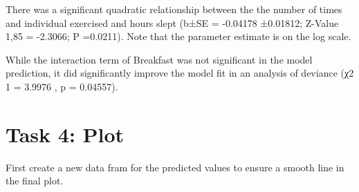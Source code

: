 \documentclass[
]{article}
\newenvironment{Shaded}{\begin{snugshade}}{\end{snugshade}}
\newcommand{\AttributeTok}[1]{\textcolor[rgb]{0.13,0.29,0.53}{#1}}
\newcommand{\DecValTok}[1]{\textcolor[rgb]{0.00,0.00,0.81}{#1}}
\newcommand{\FunctionTok}[1]{\textcolor[rgb]{0.13,0.29,0.53}{\textbf{#1}}}
\newcommand{\NormalTok}[1]{#1}
\newcommand{\OtherTok}[1]{\textcolor[rgb]{0.56,0.35,0.01}{#1}}
\newcommand{\SpecialCharTok}[1]{\textcolor[rgb]{0.81,0.36,0.00}{\textbf{#1}}}
\newcommand{\StringTok}[1]{\textcolor[rgb]{0.31,0.60,0.02}{#1}}
\begin{document}
There was a significant quadratic relationship between the the number of
times and individual exercised and hours slept (b±SE = -0.04178
±0.01812; Z-Value 1,85 = -2.3066; P =0.0211). Note that the parameter
estimate is on the log scale.

While the interaction term of Breakfast was not significant in the model
prediction, it did significantly improve the model fit in an analysis of
deviance (χ2 1 = 3.9976 , p = 0.04557).

\section{Task 4: Plot}\label{task-4-plot}

First create a new data fram for the predicted values to ensure a smooth
line in the final plot.

\begin{Shaded}
\end{Shaded}
\end{document}
